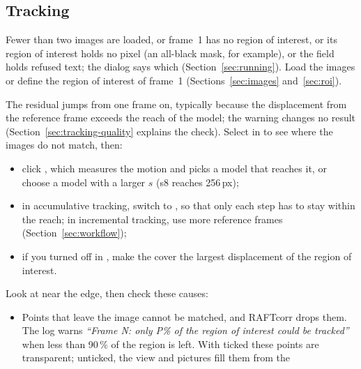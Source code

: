 \subsection{Tracking}

\begin{description}[leftmargin=0.6cm,style=nextline]
  \item[``Cannot start analysis'']
    Fewer than two images are loaded, or frame~1 has no region of interest, or its region of
    interest holds no pixel (an all-black mask, for example), or the  field
    holds refused text; the dialog says which (Section~\ref{sec:running}). Load the images or define the region of interest of frame~1
    (Sections~\ref{sec:images} and~\ref{sec:roi}).
  \item[``Tracking Quality Warning'': the motion is beyond the reach of the model]
    The residual jumps from one frame on, typically because the displacement from the reference
    frame exceeds the reach of the model; the warning changes no result
    (Section~\ref{sec:tracking-quality} explains the check). Select  in  to
    see where the images do not match, then:
    \begin{itemize}
      \item click , which measures the motion and picks a model that reaches
        it, or choose a model with a larger $s$ (s8 reaches 256\,px);
      \item in accumulative tracking, switch  to , so that only
        each step has to stay within the reach; in incremental tracking, use more reference
        frames (Section~\ref{sec:workflow});
      \item if you turned  off in , make the 
        cover the largest displacement of the region of interest.
    \end{itemize}
  \item[Results look wrong at the edges of the region of interest]
    Look at  near the edge, then check these causes:
    \begin{itemize}
      \item Points that leave the image cannot be matched, and RAFTcorr drops them. The log warns
        \emph{``Frame N: only P\% of the region of interest could be tracked''} when less than
        90\,\% of the region is left. With  ticked these points are
        transparent; unticked, the  view and pictures fill them from the

\end{itemize}
\end{description}
